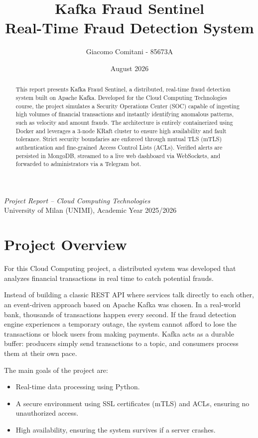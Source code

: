 \documentclass[11pt,a4paper]{article}
\title{\textbf{Kafka Fraud Sentinel} \\ \large Real-Time Fraud Detection System}
\author{Giacomo Comitani - 85673A}
\date{August 2026}
\begin{document}
\maketitle
\thispagestyle{empty}

\begin{center}
    \large \textit{Project Report -- Cloud Computing Technologies}\\[0.2em]
    \normalsize University of Milan (UNIMI), Academic Year 2025/2026
\end{center}

\begin{abstract}
This report presents Kafka Fraud Sentinel, a distributed, real-time fraud detection system built on Apache Kafka. Developed for the Cloud Computing Technologies course, the project simulates a Security Operations Center (SOC) capable of ingesting high volumes of financial transactions and instantly identifying anomalous patterns, such as velocity and amount frauds. The architecture is entirely containerized using Docker and leverages a 3-node KRaft cluster to ensure high availability and fault tolerance. Strict security boundaries are enforced through mutual TLS (mTLS) authentication and fine-grained Access Control Lists (ACLs). Verified alerts are persisted in MongoDB, streamed to a live web dashboard via WebSockets, and forwarded to administrators via a Telegram bot.
\end{abstract}
\newpage

\section{Project Overview}
For this Cloud Computing project, a distributed system was developed that analyzes financial transactions in real time to catch potential frauds. 

Instead of building a classic REST API where services talk directly to each other, an event-driven approach based on Apache Kafka was chosen. In a real-world bank, thousands of transactions happen every second. If the fraud detection engine experiences a temporary outage, the system cannot afford to lose the transactions or block users from making payments. Kafka acts as a durable buffer: producers simply send transactions to a topic, and consumers process them at their own pace.

The main goals of the project are:
\begin{itemize}
    \item Real-time data processing using Python.
    \item A secure environment using SSL certificates (mTLS) and ACLs, ensuring no unauthorized access.
    \item High availability, ensuring the system survives if a server crashes.
\end{itemize}
\end{document}
